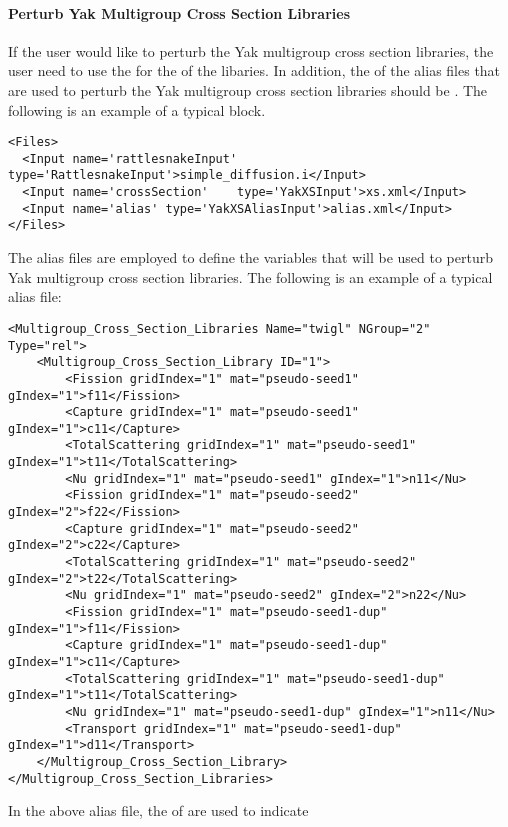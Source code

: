 \paragraph{Perturb Yak Multigroup Cross Section Libraries}
If the user would like to perturb the Yak multigroup cross section libraries, the user need to use the
 for the  of the libaries. In addition, the  of the
alias files that are used to perturb the Yak multigroup cross section libraries should be
. The following is an example of a typical  block.
%
\begin{lstlisting}[style=XML]
<Files>
  <Input name='rattlesnakeInput' type='RattlesnakeInput'>simple_diffusion.i</Input>
  <Input name='crossSection'    type='YakXSInput'>xs.xml</Input>
  <Input name='alias' type='YakXSAliasInput'>alias.xml</Input>
</Files>
\end{lstlisting}
%
The alias files are employed to define the variables that will be used to perturb Yak multigroup cross section
libraries. The following is an example of a typical alias file:
%
\begin{lstlisting}[style=XML]
<Multigroup_Cross_Section_Libraries Name="twigl" NGroup="2" Type="rel">
    <Multigroup_Cross_Section_Library ID="1">
        <Fission gridIndex="1" mat="pseudo-seed1" gIndex="1">f11</Fission>
        <Capture gridIndex="1" mat="pseudo-seed1" gIndex="1">c11</Capture>
        <TotalScattering gridIndex="1" mat="pseudo-seed1" gIndex="1">t11</TotalScattering>
        <Nu gridIndex="1" mat="pseudo-seed1" gIndex="1">n11</Nu>
        <Fission gridIndex="1" mat="pseudo-seed2" gIndex="2">f22</Fission>
        <Capture gridIndex="1" mat="pseudo-seed2" gIndex="2">c22</Capture>
        <TotalScattering gridIndex="1" mat="pseudo-seed2" gIndex="2">t22</TotalScattering>
        <Nu gridIndex="1" mat="pseudo-seed2" gIndex="2">n22</Nu>
        <Fission gridIndex="1" mat="pseudo-seed1-dup" gIndex="1">f11</Fission>
        <Capture gridIndex="1" mat="pseudo-seed1-dup" gIndex="1">c11</Capture>
        <TotalScattering gridIndex="1" mat="pseudo-seed1-dup" gIndex="1">t11</TotalScattering>
        <Nu gridIndex="1" mat="pseudo-seed1-dup" gIndex="1">n11</Nu>
        <Transport gridIndex="1" mat="pseudo-seed1-dup" gIndex="1">d11</Transport>
    </Multigroup_Cross_Section_Library>
</Multigroup_Cross_Section_Libraries>
\end{lstlisting}
%
In the above alias file, the  of  are used to indicate
